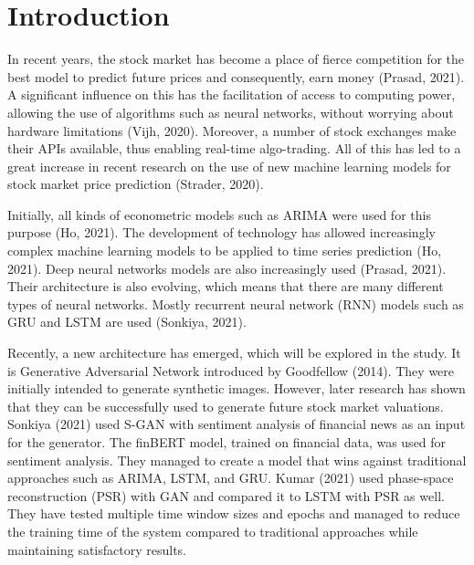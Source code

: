\documentclass[review]{elsarticle} %
\begin{document}
\vspace{\baselineskip}


\pagebreak

\renewcommand\contentsname{Table of Contents}

\tableofcontents

\pagebreak

\section{Introduction}
In recent years, the stock market has become a place of fierce competition for the best model to predict future prices and consequently, earn money (Prasad, 2021). 
A significant influence on this has the facilitation of access to computing power, allowing the use of algorithms such as neural networks, without worrying about hardware limitations (Vijh, 2020). Moreover, a number of stock exchanges make their APIs available, thus enabling real-time algo-trading. All of this has led to a great increase in recent research on the use of new machine learning models for stock market price prediction (Strader, 2020).  

Initially, all kinds of econometric models such as ARIMA were used for this purpose (Ho, 2021). The development of technology has allowed increasingly complex machine learning models to be applied to time series prediction  (Ho, 2021). Deep neural networks models are also increasingly used (Prasad, 2021). Their architecture is also evolving, which means that there are many different types of neural networks. Mostly recurrent neural network (RNN) models such as GRU and LSTM are used (Sonkiya, 2021). 

Recently, a new architecture has emerged, which will be explored in the study. It is Generative Adversarial Network introduced by Goodfellow (2014). They were initially intended to generate synthetic images. However, later research has shown that they can be successfully used to generate future stock market valuations. Sonkiya (2021) used S-GAN with sentiment analysis of financial news as an input for the generator. The finBERT model, trained on financial data, was used for sentiment analysis. They managed to create a model that wins against traditional approaches such as ARIMA, LSTM, and GRU. Kumar (2021) used phase-space reconstruction (PSR) with GAN and compared it to LSTM with PSR as well. They have tested multiple time window sizes and epochs and managed to reduce the training time of the system compared to traditional approaches while maintaining satisfactory results. 
\end{document}
